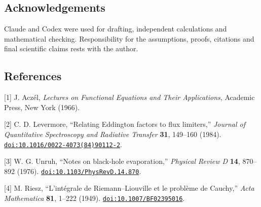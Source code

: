 \documentclass[
  11pt,
  a4paper,
]{article}
\begin{document}
\subsection{Acknowledgements}\label{acknowledgements}

Claude and Codex were used for drafting, independent calculations and mathematical checking. Responsibility for the assumptions, proofs, citations and final scientific claims rests with the author.

\subsection{References}\label{references}

{[}1{]} J. Aczél, \emph{Lectures on Functional Equations and Their Applications}, Academic Press, New York (1966).

{[}2{]} C. D. Levermore, ``Relating Eddington factors to flux limiters,'' \emph{Journal of Quantitative Spectroscopy and Radiative Transfer} \textbf{31}, 149--160 (1984). \href{https://doi.org/10.1016/0022-4073(84)90112-2}{\nolinkurl{doi:10.1016/0022-4073(84)90112-2}}.

{[}3{]} W. G. Unruh, ``Notes on black-hole evaporation,'' \emph{Physical Review D} \textbf{14}, 870--892 (1976). \href{https://doi.org/10.1103/PhysRevD.14.870}{\nolinkurl{doi:10.1103/PhysRevD.14.870}}.

{[}4{]} M. Riesz, ``L'intégrale de Riemann--Liouville et le problème de Cauchy,'' \emph{Acta Mathematica} \textbf{81}, 1--222 (1949). \href{https://doi.org/10.1007/BF02395016}{\nolinkurl{doi:10.1007/BF02395016}}.
\end{document}
